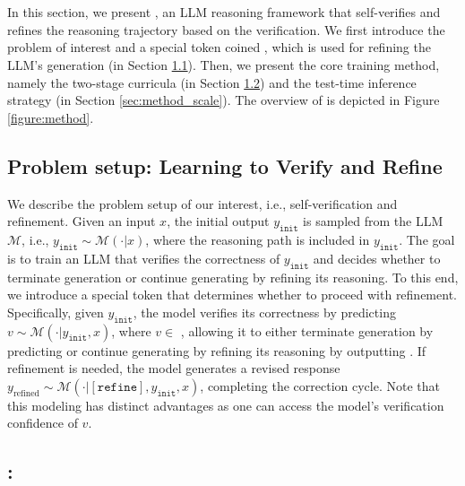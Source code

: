 
\section{\lname} \label{sec:method}


In this section, we present \mname, an LLM reasoning framework that self-verifies and refines the reasoning trajectory based on the verification. We first introduce the problem of interest and a special token coined \rethink, which is used for refining the LLM's generation (in Section \ref{sec:problem_setup}). Then, we present the core training method, namely the two-stage curricula (in Section \ref{sec:method_rethink}) and the test-time inference strategy (in Section \ref{sec:method_scale}). The overview of \sname is depicted in Figure \ref{figure:method}.

\subsection{Problem setup: Learning to Verify and Refine} 
\label{sec:problem_setup}

We describe the problem setup of our interest, i.e., self-verification and refinement. Given an input $x$, the initial output $y_\mathtt{init}$ is sampled from the LLM $\mathcal{M}$, i.e., $y_\mathtt{init} \sim \mathcal{M}(\cdot|x)$, where the reasoning path is included in $y_\mathtt{init}$. The goal is to train an LLM that verifies the correctness of $y_\mathtt{init}$ and decides whether to terminate generation or continue generating by refining its reasoning. To this end, we introduce a special token \rethink that determines whether to proceed with refinement. Specifically, given $y_\mathtt{init}$, the model verifies its correctness by predicting $v \sim \mathcal{M}(\cdot|y_\mathtt{init},x)$, where $v \in$ \rethinkeos, allowing it to either terminate generation by predicting \eos or continue generating by refining its reasoning by outputting \rethink. If refinement is needed, the model generates a revised response $y_\text{refined} \sim \mathcal{M}(\cdot|\mathtt{[refine]},y_\mathtt{init},x)$, completing the correction cycle. Note that this modeling has distinct advantages as one can access the model's verification confidence of $v$.

\subsection{\sname: \mmname}
\label{sec:method_rethink}



